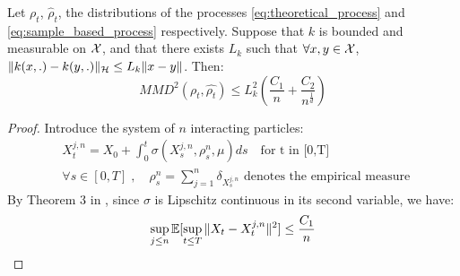 \begin{proposition} Let $\rho_t$, $\widehat{\rho}_t$, the distributions of the processes \eqref{eq:theoretical_process} and \eqref{eq:sample_based_process} respectively. Suppose that $k$ is bounded and measurable on ${{\mathcal X}}$, and that there exists $L_k$ such that $\forall x,y \in {{\mathcal X}}$, $\| k(x,.)-k(y,.) \|_{{{\mathcal H}}}\le L_k \|x-y\|$. Then:
	\begin{equation}
	MMD^2(\rho_t,\widehat{\rho_t})\le L_k^2( \frac{C_1}{n}+ \frac{C_2}{n^{\frac{1}{d}}})
	\end{equation}
\end{proposition}
\begin{proof}  
	Introduce the system of $n$ interacting particles:
	\begin{align}\label{eq:intermediary_process}
	&X_t^{j,n}=X_{0}+\int_{0}^t \sigma(X_s^{j,n}, \rho_s^n, \mu)ds \quad \text{for t in [0,T]}\\
	&\forall s \in [0,T]\;,\quad \rho_s^n=\sum_{j=1}^{n} \delta_{X_s^{j,n}} \text{ denotes the empirical measure } 
	\end{align}
	By Theorem 3 in \cite{jourdain2007nonlinear}, since $\sigma$ is Lipschitz continuous in its second variable, we have:	
	\begin{equation}\label{eq:upp_bound1}
	\sup_{j \le n}{{\mathbb E}}[\sup_{t\le T}\| X_t - X_t^{j,n}\|^2]\le \frac{C_1}{n}
	\end{equation}
	

\end{proof}
